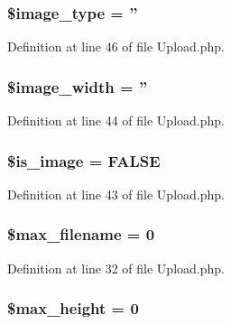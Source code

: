 \subsubsection[{\$image\-\_\-type}]{\setlength{\rightskip}{0pt plus 5cm}\$image\-\_\-type = ''}\label{class_c_i___upload_a939d6733d998cce893403d2f59f40317}


Definition at line 46 of file Upload.\-php.

\subsubsection[{\$image\-\_\-width}]{\setlength{\rightskip}{0pt plus 5cm}\$image\-\_\-width = ''}\label{class_c_i___upload_a8dadc2d2dcc0f25529a2d1e080d08169}


Definition at line 44 of file Upload.\-php.

\subsubsection[{\$is\-\_\-image}]{\setlength{\rightskip}{0pt plus 5cm}\${\bf is\-\_\-image} = F\-A\-L\-S\-E}\label{class_c_i___upload_a4dae8ae20ed5fdf406554e1911065753}


Definition at line 43 of file Upload.\-php.

\subsubsection[{\$max\-\_\-filename}]{\setlength{\rightskip}{0pt plus 5cm}\$max\-\_\-filename = 0}\label{class_c_i___upload_a7c8c80e453111c2521e355b83331a9df}


Definition at line 32 of file Upload.\-php.

\subsubsection[{\$max\-\_\-height}]{\setlength{\rightskip}{0pt plus 5cm}\$max\-\_\-height = 0}\label{class_c_i___upload_a7f2b56fde8cdd8907f9228149fc4b9bc}


